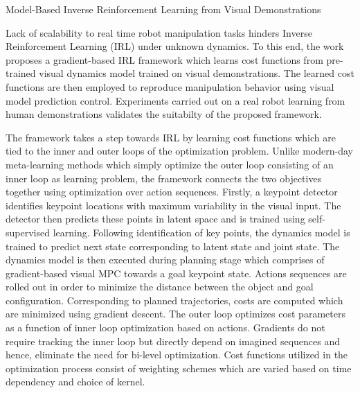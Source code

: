 \documentclass[11pt,letterpaper]{article}
\begin{document}
\begin{center}
  \large{Model-Based Inverse Reinforcement Learning from Visual Demonstrations}
\end{center}

Lack of scalability to real time robot manipulation tasks hinders Inverse Reinforcement Learning (IRL) under unknown dynamics. To this end, the work proposes a gradient-based IRL framework which learns cost functions from pre-trained visual dynamics model trained on visual demonstrations. The learned cost functions are then employed to reproduce manipulation behavior using visual model prediction control. Experiments carried out on a real robot learning from human demonstrations validates the suitabilty of the proposed framework.

The framework takes a step towards IRL by learning cost functions which are tied to the inner and outer loops of the optimization problem. Unlike modern-day meta-learning methods which simply optimize the outer loop consisting of an inner loop as learning problem, the framework connects the two objectives together using optimization over action sequences. Firstly, a keypoint detector identifies keypoint locations with maximum variability in the visual input. The detector then predicts these points in latent space and is trained using self-supervised learning. Following identification of key points, the dynamics model is trained to predict next state corresponding to latent state and joint state. The dynamics model is then executed during planning stage which comprises of gradient-based visual MPC towards a goal keypoint state. Actions sequences are rolled out in order to minimize the distance between the object and goal configuration. Corresponding to planned trajectories, costs are computed which are minimized using gradient descent. The outer loop optimizes cost parameters as a function of inner loop optimization based on actions. Gradients do not require tracking the inner loop but directly depend on imagined sequences and hence, eliminate the need for bi-level optimization. Cost functions utilized in the optimization process consist of weighting schemes which are varied based on time dependency and choice of kernel. 
\end{document}
